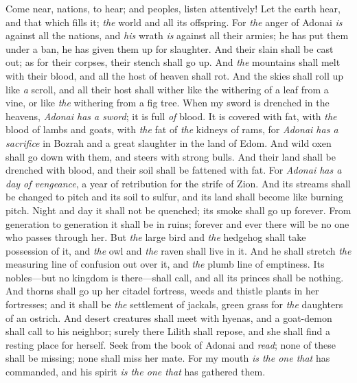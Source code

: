 \begin{biblechapter} %
 Come near, nations, to hear; 
and peoples, listen attentively! 
Let the earth hear, and that which fills it; 
\textit{the} world and all its offspring.
\verse For \textit{the} anger of Adonai \textit{is} against all the nations, 
and \textit{his} wrath \textit{is} against all their armies; 
he has put them under a ban, 
he has given them up for slaughter.
\verse And their slain shall be cast out; 
as for their corpses, their stench shall go up. 
And \textit{the} mountains shall melt with their blood,
\verse and all the host of heaven shall rot. 
And the skies shall roll up like \textit{a} scroll, 
and all their host shall wither 
like the withering of a leaf from a vine, 
or like \textit{the} withering from a fig tree.
\verse When my sword is drenched in the heavens,
\verse \textit{Adonai has a sword};
\verse it is full \textit{of} blood. 
It is covered with fat, 
with \textit{the} blood of lambs and goats, 
with \textit{the} fat of \textit{the} kidneys of rams, 
for \textit{Adonai has a sacrifice} in Bozrah 
and a great slaughter in the land of Edom.
\verse And wild oxen shall go down with them, 
and steers with strong bulls. 
And their land shall be drenched with blood, 
and their soil shall be fattened with fat.
\verse For \textit{Adonai has a day of vengeance}, 
a year of retribution for the strife of Zion.
\verse And its streams shall be changed to pitch and its soil to sulfur, 
and its land shall become like burning pitch.
\verse Night and day it shall not be quenched; 
its smoke shall go up forever. 
From generation to generation it shall be in ruins; 
forever and ever there will be no one who passes through her.
\verse But \textit{the} large bird and \textit{the} hedgehog shall take possession of it, 
and \textit{the} owl and \textit{the} raven shall live in it. 
And he shall stretch \textit{the} measuring line of confusion out over it, 
and \textit{the} plumb line of emptiness.
\verse Its nobles—but no kingdom is there—shall call, 
and all its princes shall be nothing.
\verse And thorns shall go up her citadel fortress, 
weeds and thistle plants in her fortresses; 
and it shall be \textit{the} settlement of jackals, 
green grass for \textit{the} daughters of an ostrich.
\verse And desert creatures shall meet with hyenas, 
and a goat-demon shall call to his neighbor; 
surely there Lilith shall repose, 
and she shall find a resting place for herself.
\verse Seek from the book of Adonai and \textit{read};
\verse none of these shall be missing; 
none shall miss her mate. 
For my mouth \textit{is the one that} has commanded, 
and his spirit \textit{is the one that} has gathered them.
\end{biblechapter}

